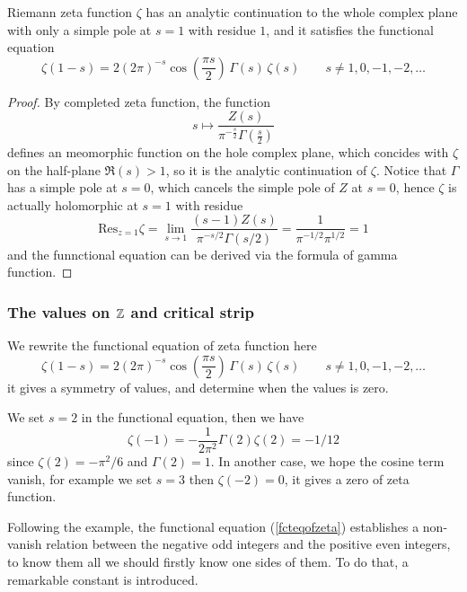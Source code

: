 \begin{colorcorollary}
    Riemann zeta function \(\zeta\) has an analytic continuation to the whole complex plane with only a simple pole at \(s = 1\) with residue \(1\), and it satisfies the functional equation
     \[\zeta(1-s) = 2(2\pi)^{-s} \cos(\frac{\pi s}{2}) \, \Gamma(s) \, \zeta(s) 
    \qquad  s\neq 1,0,-1,-2,\dots\]
\end{colorcorollary}

\begin{proof}
    By completed zeta function, the function
    \[s \mapsto \frac{Z(s)}{\pi^{-\frac{s}{2}} \Gamma\left(\frac{s}{2}\right)}\]
    defines an meomorphic function on the hole complex plane, which concides with \(\zeta\) on the half-plane \(\Re(s)>1\), so it is the analytic continuation of \(\zeta\). Notice that \(\Gamma\) has a simple pole at \(s = 0\), which cancels the simple pole of \(Z\) at \(s = 0\), hence \(\zeta\) is actually holomorphic at \(s = 1\) with residue
    \[\mathrm{Res}_{z=1} \zeta = \lim_{s \to 1}  \frac{(s-1)Z(s)}{\pi^{-s/2} \Gamma(s/2)} = \frac{1}{\pi^{-1/2} \pi^{1/2}} = 1\]
    and the funnctional equation can be derived via the formula of gamma function.
\end{proof}

\subsubsection{The values on \(\mathbb{Z}\) and critical strip}

We rewrite the functional equation of zeta function here
\begin{equation} \label{fcteqofzeta}
    \zeta(1-s) = 2(2\pi)^{-s} \cos(\frac{\pi s}{2}) \, \Gamma(s) \, \zeta(s) 
    \qquad  s\neq 1,0,-1,-2,\dots
\end{equation}
it gives a symmetry of values, and determine when the values is zero.

\begin{example}
    We set \(s= 2\) in the functional equation, then we have
    \[\zeta(-1) = - \frac{1}{2\pi^2} \Gamma(2) \zeta(2) = -1/12\]
    since \(\zeta(2) = -\pi^2/6\) and \(\Gamma(2) = 1\). In another case, we hope the cosine term vanish, for example we set \(s = 3\) then \(\zeta(-2) = 0\), it gives a zero of zeta function.
\end{example}

Following the example, the functional equation (\ref{fcteqofzeta}) establishes a non-vanish relation between the negative odd integers and the positive even integers, to know them all we should firstly know one sides of them. To do that, a remarkable constant is introduced.

